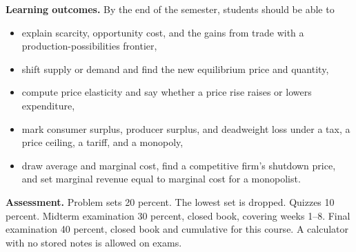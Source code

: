 \documentclass[11pt]{article}
\begin{document}
\textbf{Learning outcomes.}
By the end of the semester, students should be able to
\begin{itemize}
\item explain scarcity, opportunity cost, and the gains from trade with a production-possibilities frontier,
\item shift supply or demand and find the new equilibrium price and quantity,
\item compute price elasticity and say whether a price rise raises or lowers expenditure,
\item mark consumer surplus, producer surplus, and deadweight loss under a tax, a price ceiling, a tariff, and a monopoly,
\item draw average and marginal cost, find a competitive firm's shutdown price, and set marginal revenue equal to marginal cost for a monopolist.
\end{itemize}

\textbf{Assessment.}
Problem sets 20 percent. The lowest set is dropped. Quizzes 10 percent. Midterm examination 30 percent, closed book, covering weeks 1--8. Final examination 40 percent, closed book and cumulative for this course. A calculator with no stored notes is allowed on exams.
\end{document}
